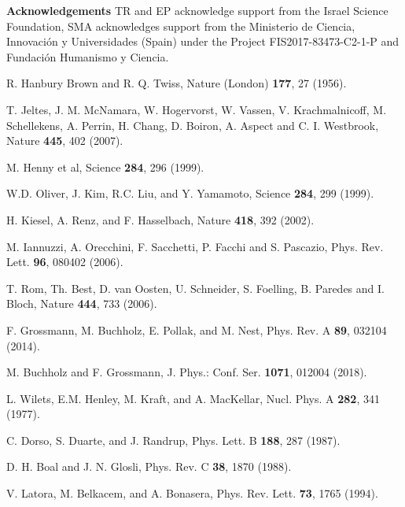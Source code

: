 \documentclass[preprint,aps]{revtex4}
\begin{document}
\vspace{1cm}
\noindent
{\bf Acknowledgements}
TR and EP acknowledge support from the Israel Science Foundation, SMA acknowledges support from the Ministerio de Ciencia, Innovaci\'on y Universidades (Spain) 
under the Project FIS2017-83473-C2-1-P and Fundaci\'on Humanismo y Ciencia.


\bigskip

\begin{thebibliography}{99}
	
 R. Hanbury Brown and R. Q. Twiss, Nature (London)
\textbf{177}, 27 (1956).

 T. Jeltes, J. M. McNamara, W. Hogervorst, W. Vassen, V.
Krachmalnicoff, M. Schellekens, A. Perrin, H. Chang, D. Boiron, A. Aspect
and C. I. Westbrook, Nature \textbf{445}, 402 (2007).

 M. Henny et al, Science \textbf{284}, 296 (1999).

 W.D. Oliver, J. Kim, R.C. Liu, and Y. Yamamoto, Science
\textbf{284}, 299 (1999).

 H. Kiesel, A. Renz, and F. Hasselbach, Nature \textbf{%
418}, 392 (2002).

 M. Iannuzzi, A. Orecchini, F. Sacchetti, P. Facchi and
S. Pascazio, Phys. Rev. Lett. \textbf{96}, 080402 (2006).

 T. Rom, Th. Best, D. van Oosten, U. Schneider, S.
Foelling, B. Paredes and I. Bloch, Nature \textbf{444}, 733 (2006).

 F. Grossmann, M. Buchholz, E. Pollak, and M. Nest,
Phys. Rev. A \textbf{89}, 032104 (2014).

 M. Buchholz and F. Grossmann, J. Phys.: Conf. Ser.
\textbf{1071}, 012004 (2018).

 L. Wilets, E.M. Henley, M. Kraft, and A. MacKellar,
Nucl. Phys. A \textbf{282}, 341 (1977).

 C. Dorso, S. Duarte, and J. Randrup, Phys. Lett. B
\textbf{188}, 287 (1987).

 D. H. Boal and J. N. Glosli, Phys. Rev. C \textbf{38},
1870 (1988).

 V. Latora, M. Belkacem, and A. Bonasera, Phys. Rev.
Lett. \textbf{73}, 1765 (1994).


\end{thebibliography}
\end{document}
